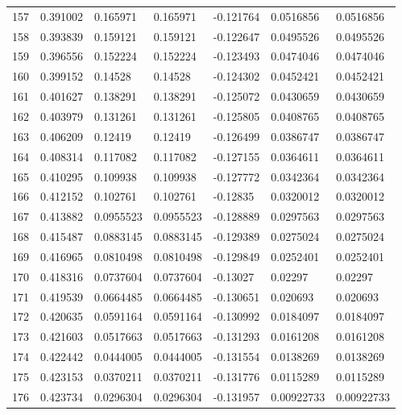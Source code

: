 \begin{longtable}{l|lll|lll}
 157 &  0.391002    & 0.165971    & 0.165971    & -0.121764    & 0.0516856   & 0.0516856   \\
 158 &  0.393839    & 0.159121    & 0.159121    & -0.122647    & 0.0495526   & 0.0495526   \\
 159 &  0.396556    & 0.152224    & 0.152224    & -0.123493    & 0.0474046   & 0.0474046   \\
 160 &  0.399152    & 0.14528     & 0.14528     & -0.124302    & 0.0452421   & 0.0452421   \\
 161 &  0.401627    & 0.138291    & 0.138291    & -0.125072    & 0.0430659   & 0.0430659   \\
 162 &  0.403979    & 0.131261    & 0.131261    & -0.125805    & 0.0408765   & 0.0408765   \\
 163 &  0.406209    & 0.12419     & 0.12419     & -0.126499    & 0.0386747   & 0.0386747   \\
 164 &  0.408314    & 0.117082    & 0.117082    & -0.127155    & 0.0364611   & 0.0364611   \\
 165 &  0.410295    & 0.109938    & 0.109938    & -0.127772    & 0.0342364   & 0.0342364   \\
 166 &  0.412152    & 0.102761    & 0.102761    & -0.12835     & 0.0320012   & 0.0320012   \\
 167 &  0.413882    & 0.0955523   & 0.0955523   & -0.128889    & 0.0297563   & 0.0297563   \\
 168 &  0.415487    & 0.0883145   & 0.0883145   & -0.129389    & 0.0275024   & 0.0275024   \\
 169 &  0.416965    & 0.0810498   & 0.0810498   & -0.129849    & 0.0252401   & 0.0252401   \\
 170 &  0.418316    & 0.0737604   & 0.0737604   & -0.13027     & 0.02297     & 0.02297     \\
 171 &  0.419539    & 0.0664485   & 0.0664485   & -0.130651    & 0.020693    & 0.020693    \\
 172 &  0.420635    & 0.0591164   & 0.0591164   & -0.130992    & 0.0184097   & 0.0184097   \\
 173 &  0.421603    & 0.0517663   & 0.0517663   & -0.131293    & 0.0161208   & 0.0161208   \\
 174 &  0.422442    & 0.0444005   & 0.0444005   & -0.131554    & 0.0138269   & 0.0138269   \\
 175 &  0.423153    & 0.0370211   & 0.0370211   & -0.131776    & 0.0115289   & 0.0115289   \\
 176 &  0.423734    & 0.0296304   & 0.0296304   & -0.131957    & 0.00922733  & 0.00922733  \\

\end{longtable}

